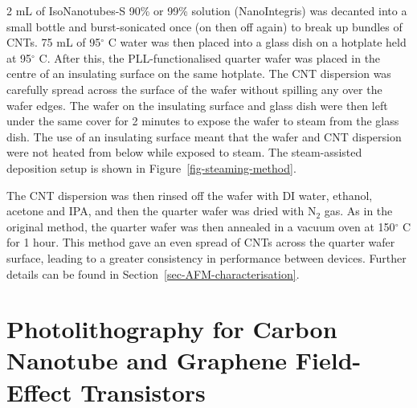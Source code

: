 \documentclass[
  a4paper,
]{scrbook}
\begin{document}
2 mL of IsoNanotubes-S 90\% or 99\% solution (NanoIntegris) was decanted
into a small bottle and burst-sonicated once (on then off again) to
break up bundles of CNTs. 75 mL of 95\(^\circ\) C water was then placed
into a glass dish on a hotplate held at 95\(^\circ\) C. After this, the
PLL-functionalised quarter wafer was placed in the centre of an
insulating surface on the same hotplate. The CNT dispersion was
carefully spread across the surface of the wafer without spilling any
over the wafer edges. The wafer on the insulating surface and glass dish
were then left under the same cover for 2 minutes to expose the wafer to
steam from the glass dish. The use of an insulating surface meant that
the wafer and CNT dispersion were not heated from below while exposed to
steam. The steam-assisted deposition setup is shown in
Figure~\ref{fig-steaming-method}.

The CNT dispersion was then rinsed off the wafer with DI water, ethanol,
acetone and IPA, and then the quarter wafer was dried with N\(_2\) gas.
As in the original method, the quarter wafer was then annealed in a
vacuum oven at 150\(^\circ\) C for 1 hour. This method gave an even
spread of CNTs across the quarter wafer surface, leading to a greater
consistency in performance between devices. Further details can be found
in Section~\ref{sec-AFM-characterisation}.

\hypertarget{photolithography-for-carbon-nanotube-and-graphene-field-effect-transistors}{%
\section{Photolithography for Carbon Nanotube and Graphene Field-Effect
Transistors}\label{photolithography-for-carbon-nanotube-and-graphene-field-effect-transistors}}
\end{document}
